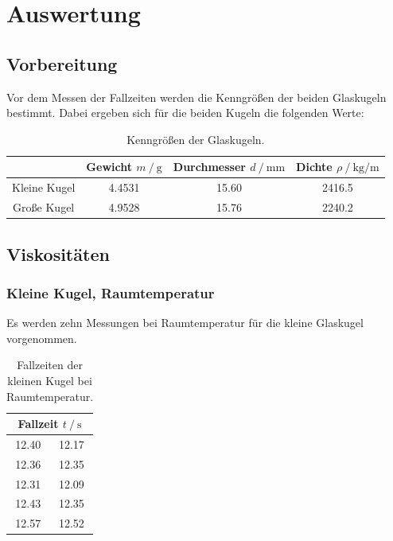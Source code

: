 \section{Auswertung}
\label{sec:Auswertung}
\subsection{Vorbereitung}
Vor dem Messen der Fallzeiten werden die Kenngrößen der beiden Glaskugeln bestimmt. Dabei ergeben sich für die beiden Kugeln die folgenden Werte:

\begin{table}[h]
    \centering
    \caption{Kenngrößen der Glaskugeln.}
    \label{tab:mess_klKugel_raum}
    \begin{tabular}{c c c c}
        \toprule
        & {Gewicht $m\:/\:\si{\gram}$} & {Durchmesser $d\:/\:\si{\milli\meter}$} & Dichte $\rho\:/\:\si{\kilo\gram\per\meter}$\\
        \midrule %
        Kleine Kugel & 4.4531 & 15.60 & 2416.5 \\
        Große Kugel  & 4.9528 & 15.76 & 2240.2 \\
        \bottomrule
    \end{tabular}    
\end{table}
\subsection{Viskositäten}
\subsubsection{Kleine Kugel, Raumtemperatur}
Es werden zehn Messungen bei Raumtemperatur für die kleine Glaskugel vorgenommen.

\begin{table}[h]
    \centering
    \caption{Fallzeiten der kleinen Kugel bei Raumtemperatur.}
    \label{tab:mess_klKugel_raum}
    \begin{tabular}{c c}
        \toprule
        \multicolumn{2}{c}{Fallzeit $t\:/\:\si{\second}$} \\
        \midrule
        12.40 & 12.17 \\
        12.36 & 12.35 \\
        12.31 & 12.09 \\
        12.43 & 12.35 \\
        12.57 & 12.52 \\
        \bottomrule
    \end{tabular}    
\end{table}

